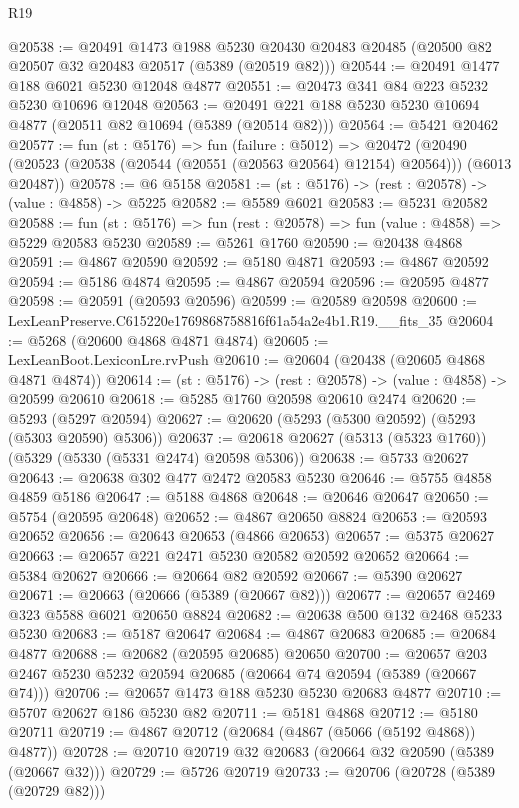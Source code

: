 \begin{lexlean}{R19}
\begin{coremodule}
@20538 := @20491
    @1473
    @1988
    @5230
    @20430
    @20483
    @20485
    (@20500 @82 @20507 @32 @20483 @20517 (@5389 (@20519 @82)))
@20544 := @20491 @1477 @188 @6021 @5230 @12048 @4877
@20551 := @20473 @341 @84 @223 @5232 @5230 @10696 @12048
@20563 := @20491 @221 @188 @5230 @5230 @10694 @4877 (@20511 @82 @10694 (@5389 (@20514 @82)))
@20564 := @5421 @20462
@20577 := fun (st : @5176) =>
  fun (failure : @5012) =>
  @20472 (@20490 (@20523 (@20538 (@20544 (@20551 (@20563 @20564) @12154) @20564))) (@6013 @20487))
@20578 := @6 @5158
@20581 := (st : @5176) -> (rest : @20578) -> (value : @4858) -> @5225
@20582 := @5589 @6021
@20583 := @5231 @20582
@20588 := fun (st : @5176) => fun (rest : @20578) => fun (value : @4858) => @5229 @20583 @5230
@20589 := @5261 @1760
@20590 := @20438 @4868
@20591 := @4867 @20590
@20592 := @5180 @4871
@20593 := @4867 @20592
@20594 := @5186 @4874
@20595 := @4867 @20594
@20596 := @20595 @4877
@20598 := @20591 (@20593 @20596)
@20599 := @20589 @20598
@20600 := LexLeanPreserve.C615220e1769868758816f61a54a2e4b1.R19.__fits_35
@20604 := @5268 (@20600 @4868 @4871 @4874)
@20605 := LexLeanBoot.LexiconLre.rvPush
@20610 := @20604 (@20438 (@20605 @4868 @4871 @4874))
@20614 := (st : @5176) -> (rest : @20578) -> (value : @4858) -> @20599 @20610
@20618 := @5285 @1760 @20598 @20610 @2474
@20620 := @5293 (@5297 @20594)
@20627 := @20620 (@5293 (@5300 @20592) (@5293 (@5303 @20590) @5306))
@20637 := @20618 @20627 (@5313 (@5323 @1760)) (@5329 (@5330 (@5331 @2474) @20598 @5306))
@20638 := @5733 @20627
@20643 := @20638 @302 @477 @2472 @20583 @5230
@20646 := @5755 @4858 @4859 @5186
@20647 := @5188 @4868
@20648 := @20646 @20647
@20650 := @5754 (@20595 @20648)
@20652 := @4867 @20650 @8824
@20653 := @20593 @20652
@20656 := @20643 @20653 (@4866 @20653)
@20657 := @5375 @20627
@20663 := @20657 @221 @2471 @5230 @20582 @20592 @20652
@20664 := @5384 @20627
@20666 := @20664 @82 @20592
@20667 := @5390 @20627
@20671 := @20663 (@20666 (@5389 (@20667 @82)))
@20677 := @20657 @2469 @323 @5588 @6021 @20650 @8824
@20682 := @20638 @500 @132 @2468 @5233 @5230
@20683 := @5187 @20647
@20684 := @4867 @20683
@20685 := @20684 @4877
@20688 := @20682 (@20595 @20685) @20650
@20700 := @20657 @203 @2467 @5230 @5232 @20594 @20685 (@20664 @74 @20594 (@5389 (@20667 @74)))
@20706 := @20657 @1473 @188 @5230 @5230 @20683 @4877
@20710 := @5707 @20627 @186 @5230 @82
@20711 := @5181 @4868
@20712 := @5180 @20711
@20719 := @4867 @20712 (@20684 (@4867 (@5066 (@5192 @4868)) @4877))
@20728 := @20710 @20719 @32 @20683 (@20664 @32 @20590 (@5389 (@20667 @32)))
@20729 := @5726 @20719
@20733 := @20706 (@20728 (@5389 (@20729 @82)))

\end{coremodule}
\end{lexlean}
